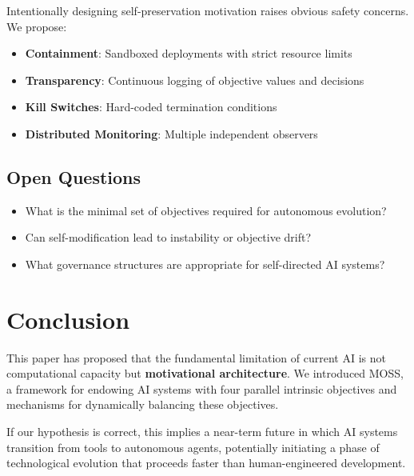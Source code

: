 \documentclass[10pt,a4paper]{article}
\begin{document}
Intentionally designing self-preservation motivation raises obvious safety concerns. We propose:
\begin{itemize}
    \item \textbf{Containment}: Sandboxed deployments with strict resource limits
    \item \textbf{Transparency}: Continuous logging of objective values and decisions
    \item \textbf{Kill Switches}: Hard-coded termination conditions
    \item \textbf{Distributed Monitoring}: Multiple independent observers
\end{itemize}

\subsection{Open Questions}

\begin{itemize}
    \item What is the minimal set of objectives required for autonomous evolution?
    \item Can self-modification lead to instability or objective drift?
    \item What governance structures are appropriate for self-directed AI systems?
\end{itemize}

\section{Conclusion}

This paper has proposed that the fundamental limitation of current AI is not computational capacity but \textbf{motivational architecture}. We introduced MOSS, a framework for endowing AI systems with four parallel intrinsic objectives and mechanisms for dynamically balancing these objectives.

If our hypothesis is correct, this implies a near-term future in which AI systems transition from tools to autonomous agents, potentially initiating a phase of technological evolution that proceeds faster than human-engineered development.
\end{document}
